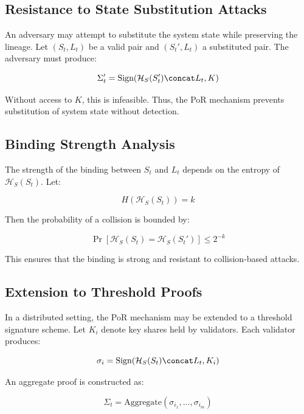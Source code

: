 \subsection{Resistance to State Substitution Attacks}

An adversary may attempt to substitute the system state while preserving the lineage. Let $(S_t, L_t)$ be a valid pair and $(S_t', L_t)$ a substituted pair. The adversary must produce:

\begin{equation}
\Sigma_t' = \text{Sign}(\mathcal{H}_S(S_t') \concat L_t, K)
\end{equation}

Without access to $K$, this is infeasible. Thus, the PoR mechanism prevents substitution of system state without detection.

\subsection{Binding Strength Analysis}

The strength of the binding between $S_t$ and $L_t$ depends on the entropy of $\mathcal{H}_S(S_t)$. Let:

\begin{equation}
H(\mathcal{H}_S(S_t)) = k
\end{equation}

Then the probability of a collision is bounded by:

\begin{equation}
\Pr[\mathcal{H}_S(S_t) = \mathcal{H}_S(S_t')] \leq 2^{-k}
\end{equation}

This ensures that the binding is strong and resistant to collision-based attacks.

\subsection{Extension to Threshold Proofs}

In a distributed setting, the PoR mechanism may be extended to a threshold signature scheme. Let $K_i$ denote key shares held by validators. Each validator produces:

\begin{equation}
\sigma_i = \text{Sign}(\mathcal{H}_S(S_t) \concat L_t, K_i)
\end{equation}

An aggregate proof is constructed as:

\begin{equation}
\Sigma_t = \text{Aggregate}(\sigma_{i_1}, \dots, \sigma_{i_m})
\end{equation}

